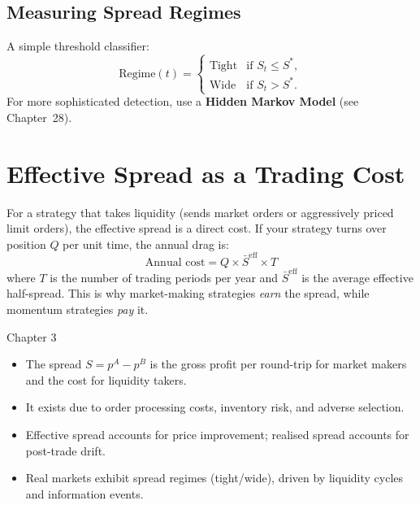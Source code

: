 \documentclass[12pt,a4paper,openany]{report}
\theoremstyle{definition}
\begin{document}
\subsection{Measuring Spread Regimes}

A simple threshold classifier:
\begin{equation}
  \text{Regime}(t) = \begin{cases} \text{Tight} & \text{if } S_t \leq S^*, \\ \text{Wide} & \text{if } S_t > S^*. \end{cases}
\end{equation}
For more sophisticated detection, use a \textbf{Hidden Markov Model} (see Chapter~28).

\section{Effective Spread as a Trading Cost}

For a strategy that takes liquidity (sends market orders or aggressively priced limit orders), the effective spread is a direct cost. If your strategy turns over position $Q$ per unit time, the annual drag is:
\begin{equation}
  \text{Annual cost} = Q \times \bar{S}^{\text{eff}} \times T
\end{equation}
where $T$ is the number of trading periods per year and $\bar{S}^{\text{eff}}$ is the average effective half-spread. This is why market-making strategies \emph{earn} the spread, while momentum strategies \emph{pay} it.

\begin{takeawaybox}{Chapter 3}
\begin{itemize}
  \item The spread $S = p^A - p^B$ is the gross profit per round-trip for market makers and the cost for liquidity takers.
  \item It exists due to order processing costs, inventory risk, and adverse selection.
  \item Effective spread accounts for price improvement; realised spread accounts for post-trade drift.
  \item Real markets exhibit spread regimes (tight/wide), driven by liquidity cycles and information events.
\end{itemize}
\end{takeawaybox}

\end{document}
